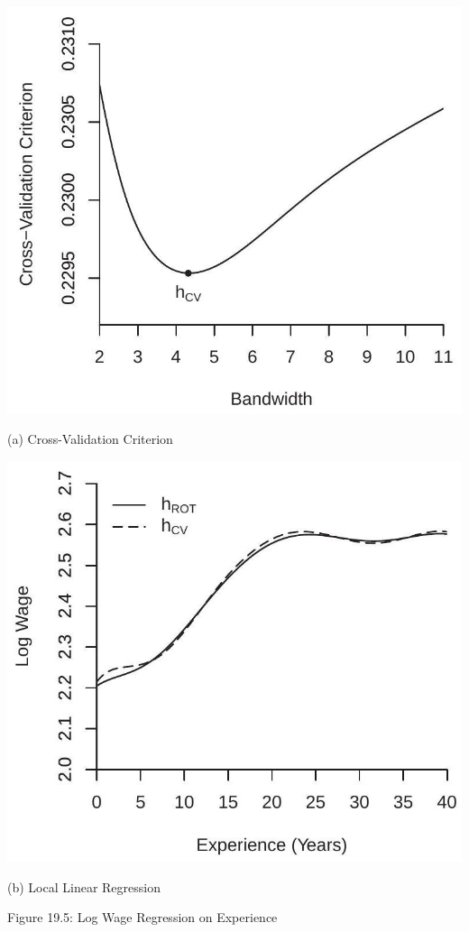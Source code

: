 \documentclass[10pt]{article}
\begin{document}
\includegraphics[max width=\textwidth]{2022_10_23_027876b875523fa3ea56g-23}

(a) Cross-Validation Criterion

\includegraphics[max width=\textwidth]{2022_10_23_027876b875523fa3ea56g-23(1)}

(b) Local Linear Regression

Figure 19.5: Log Wage Regression on Experience
\end{document}
